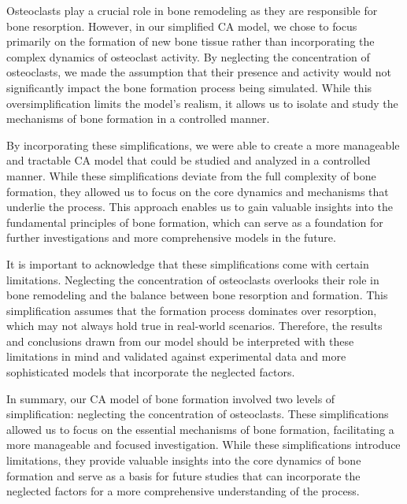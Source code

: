 \documentclass[conference]{IEEEtran}
\begin{document}
Osteoclasts play a crucial role in bone remodeling as they are responsible for bone resorption. However, in our simplified CA model, we chose to focus primarily on the formation of new bone tissue rather than incorporating the complex dynamics of osteoclast activity. By neglecting the concentration of osteoclasts, we made the assumption that their presence and activity would not significantly impact the bone formation process being simulated. While this oversimplification limits the model's realism, it allows us to isolate and study the mechanisms of bone formation in a controlled manner.

By incorporating these simplifications, we were able to create a more manageable and tractable CA model that could be studied and analyzed in a controlled manner. While these simplifications deviate from the full complexity of bone formation, they allowed us to focus on the core dynamics and mechanisms that underlie the process. This approach enables us to gain valuable insights into the fundamental principles of bone formation, which can serve as a foundation for further investigations and more comprehensive models in the future.

It is important to acknowledge that these simplifications come with certain limitations. Neglecting the concentration of osteoclasts overlooks their role in bone remodeling and the balance between bone resorption and formation. This simplification assumes that the formation process dominates over resorption, which may not always hold true in real-world scenarios. Therefore, the results and conclusions drawn from our model should be interpreted with these limitations in mind and validated against experimental data and more sophisticated models that incorporate the neglected factors.

In summary, our CA model of bone formation involved two levels of simplification: neglecting the concentration of osteoclasts. These simplifications allowed us to focus on the essential mechanisms of bone formation, facilitating a more manageable and focused investigation. While these simplifications introduce limitations, they provide valuable insights into the core dynamics of bone formation and serve as a basis for future studies that can incorporate the neglected factors for a more comprehensive understanding of the process.
\end{document}
